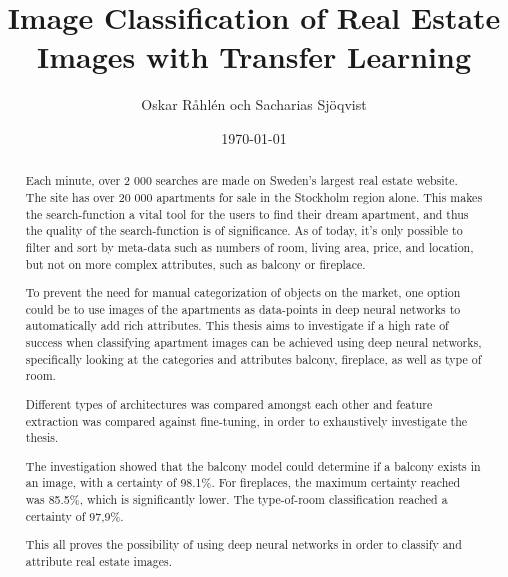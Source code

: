 \documentclass[]{kththesis}
\title{Image Classification of Real Estate Images with Transfer Learning}
\author{Oskar Råhlén och Sacharias Sjöqvist}
\date{\today}
\begin{document}
\frontmatter

\begin{abstract}
Each minute, over 2 000 searches are made on Sweden’s largest real estate website. The site has over 20 000 apartments for sale in the Stockholm region alone. This makes the search-function a vital tool for the users to find their dream apartment, and thus the quality of the search-function is of significance. As of today, it’s only possible to filter and sort by meta-data such as numbers of room, living area, price, and location, but not on more complex attributes, such as balcony or fireplace. 

To prevent the need for manual categorization of objects on the market, one option could be to use images of the apartments as data-points in deep neural networks to automatically add rich attributes. This thesis aims to investigate if a high rate of success when classifying apartment images can be achieved using deep neural networks, specifically looking at the categories and attributes balcony, fireplace, as well as type of room.

Different types of architectures was compared amongst each other and feature extraction was compared against fine-tuning, in order to exhaustively investigate the thesis.

The investigation showed that the balcony model could determine if a balcony exists in an image, with a certainty of 98.1\%. For fireplaces, the maximum certainty reached was 85.5\%, which is significantly lower. The type-of-room classification reached a certainty of 97,9\%. 

This all proves the possibility of using deep neural networks in order to classify and attribute real estate images.  
\end{abstract}
\end{document}
